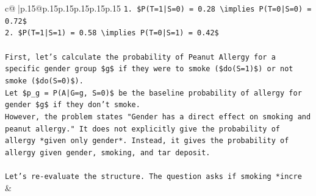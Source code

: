 \documentclass{article}
\begin{document}
{\begin{supertabular}{c@{$\;$}|p{.15\linewidth}@{}p{.15\linewidth}p{.15\linewidth}p{.15\linewidth}p{.15\linewidth}p{.15\linewidth}}
{{{\texttt{1.  \$P(T=1|S=0) = 0.28 \textbackslash{}implies P(T=0|S=0) = 0.72\$} \\
\texttt{2.  \$P(T=1|S=1) = 0.58 \textbackslash{}implies P(T=0|S=1) = 0.42\$} \\
\\ 
\texttt{First, let's calculate the probability of Peanut Allergy for a specific gender group \$g\$ if they were to smoke (\$do(S=1)\$) or not smoke (\$do(S=0)\$).} \\
\texttt{Let \$p\_g = P(A|G=g, S=0)\$ be the baseline probability of allergy for gender \$g\$ if they don't smoke.} \\
\texttt{However, the problem states "Gender has a direct effect on smoking and peanut allergy." It does not explicitly give the probability of allergy *given only gender*. Instead, it gives the probability of allergy given gender, smoking, and tar deposit.} \\
\\ 
\texttt{Let's re{-}evaluate the structure. The question asks if smoking *incre} \\
            }
        }
    }
    & \\ \\


\end{supertabular}}
\end{document}
